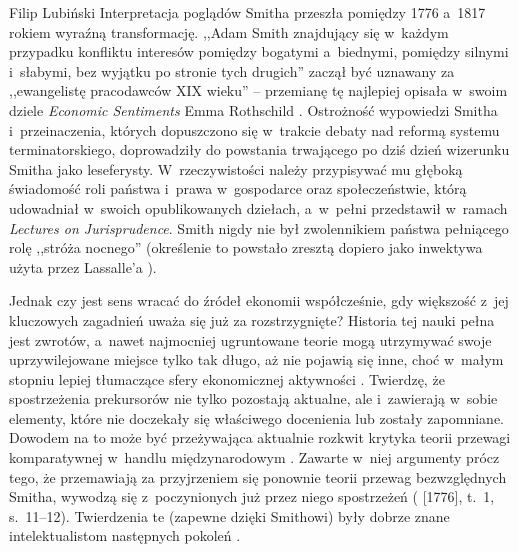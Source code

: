 \begin{artplenv}{Filip Lubiński}
Interpretacja poglądów Smitha przeszła pomiędzy 1776 a~1817 rokiem wyraźną transformację. ,,Adam Smith znajdujący
się w~każdym przypadku konfliktu interesów pomiędzy bogatymi a~biednymi, pomiędzy silnymi i~słabymi, bez wyjątku po
stronie tych drugich''
\parencite[s.~223]{menger_kleinere_1935}
zaczął być uznawany za ,,ewangelistę pracodawców
XIX wieku'' -- przemianę tę najlepiej opisała w~swoim dziele \textit{Economic Sentiments} Emma Rothschild
\parencite*[s.~113]{rothschild_economic_2002}.
Ostrożność wypowiedzi Smitha i~przeinaczenia, których dopuszczono
się w~trakcie debaty nad reformą systemu terminatorskiego, doprowadziły do powstania trwającego po dziś dzień wizerunku
Smitha jako leseferysty. W~rzeczywistości należy przypisywać mu głęboką świadomość roli państwa i~prawa w~gospodarce
oraz społeczeństwie, którą udowadniał w~swoich opublikowanych dziełach, a~w~pełni przedstawił w~ramach \textit{Lectures
on Jurisprudence}. Smith nigdy nie był zwolennikiem państwa pełniącego rolę ,,stróża nocnego'' (określenie to powstało
zresztą dopiero jako inwektywa użyta przez Lassalle'a
\parencite[s.~87]{sawer_ethical_2003}).

Jednak czy jest sens wracać do źródeł ekonomii współcześnie, gdy większość z~jej kluczowych zagadnień uważa się już
za rozstrzygnięte? Historia tej nauki pełna jest zwrotów, a~nawet najmocniej ugruntowane teorie mogą utrzymywać swoje
uprzywilejowane miejsce tylko tak długo, aż nie pojawią się inne, choć w~małym stopniu lepiej tłumaczące sfery
ekonomicznej aktywności
\parencite[s.~33]{blaug_teoria_1994}.
Twierdzę, że spostrzeżenia prekursorów nie tylko
pozostają aktualne, ale i~zawierają w~sobie elementy, które nie doczekały się właściwego docenienia lub zostały
zapomniane. Dowodem na to może być przeżywająca aktualnie rozkwit krytyka teorii przewagi komparatywnej w~handlu
międzynarodowym
\parencite{reinert_how_2008}.
Zawarte w~niej argumenty prócz tego, że przemawiają za przyjrzeniem
się ponownie teorii przewag bezwzględnych Smitha, wywodzą się z~poczynionych już przez niego spostrzeżeń 
(\cite{smith_badania_2007} [1776], t.~1, s.~11--12).
Twierdzenia te (zapewne dzięki Smithowi) były dobrze znane intelektualistom następnych pokoleń
\parencite[s.~343]{tolstoj_anna_1986}.


\end{artplenv}
